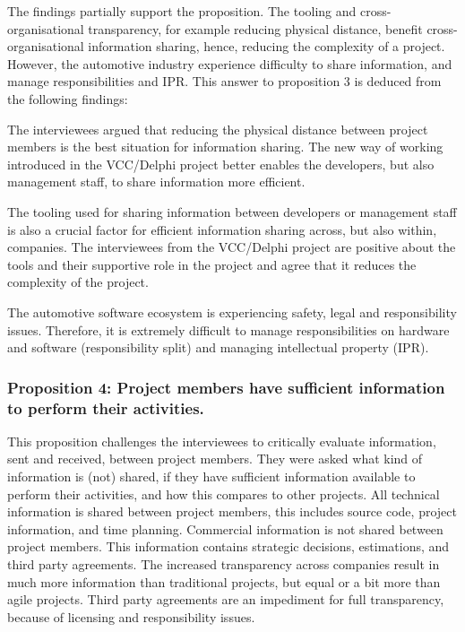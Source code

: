 The findings partially support the proposition. The tooling and cross-organisational transparency, for example reducing physical distance, benefit cross-organisational information sharing, hence, reducing the complexity of a project. However, the automotive industry experience difficulty to share information, and manage responsibilities and IPR. This answer to proposition 3 is deduced from the following findings:

 The interviewees argued that reducing the physical distance between project members is the best situation for information sharing. The new way of working introduced in the VCC/Delphi project better enables the developers, but also management staff, to share information more efficient.

 The tooling used for sharing information between developers or management staff is also a crucial factor for efficient information sharing across, but also within, companies. The interviewees from the VCC/Delphi project are positive about the tools and their supportive role in the project and agree that it reduces the complexity of the project.

 The automotive software ecosystem is experiencing safety, legal and responsibility issues. Therefore, it is extremely difficult to manage responsibilities on hardware and software (responsibility split) and managing intellectual property (IPR). 
\subsubsection{Proposition 4: Project members have sufficient information to perform their activities.}

This proposition challenges the interviewees to critically evaluate information, sent and received, between project members. They were asked what kind of information is (not) shared, if they have sufficient information available to perform their activities, and how this compares to other projects. All technical information is shared between project members, this includes source code, project information, and time planning. Commercial information is not shared between project members. This information contains strategic decisions, estimations, and third party agreements. The increased transparency across companies result in much more information than traditional projects, but equal or a bit more than agile projects. Third party agreements are an impediment for full transparency, because of licensing and responsibility issues.

